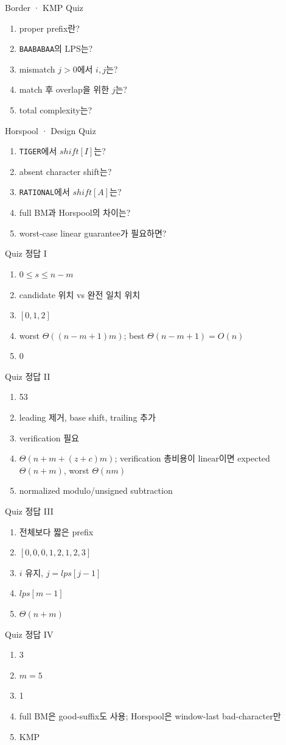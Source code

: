 \begin{frame}{Border · KMP Quiz}
\small\begin{enumerate}\item proper prefix란?\item \texttt{BAABABAA}의 LPS는?\item mismatch \(j>0\)에서 \(i,j\)는?\item match 후 overlap을 위한 \(j\)는?\item total complexity는?\end{enumerate}
\end{frame}
\begin{frame}{Horspool · Design Quiz}
\small\begin{enumerate}\item \texttt{TIGER}에서 \(shift[I]\)는?\item absent character shift는?\item \texttt{RATIONAL}에서 \(shift[A]\)는?\item full BM과 Horspool의 차이는?\item worst-case linear guarantee가 필요하면?\end{enumerate}
\end{frame}
\begin{frame}{Quiz 정답 I}
\small\begin{enumerate}\item \(0\le s\le n-m\)\item candidate 위치 vs 완전 일치 위치\item \([0,1,2]\)\item worst \(\Theta((n-m+1)m)\); best \(\Theta(n-m+1)=O(n)\)\item 0\end{enumerate}
\end{frame}
\begin{frame}{Quiz 정답 II}
\small\begin{enumerate}\item 53\item leading 제거, base shift, trailing 추가\item verification 필요\item \(\Theta(n+m+(z+c)m)\); verification 총비용이 linear이면 expected \(\Theta(n+m)\), worst \(\Theta(nm)\)\item normalized modulo/unsigned subtraction\end{enumerate}
\end{frame}
\begin{frame}{Quiz 정답 III}
\small\begin{enumerate}\item 전체보다 짧은 prefix\item \([0,0,0,1,2,1,2,3]\)\item \(i\) 유지, \(j=lps[j-1]\)\item \(lps[m-1]\)\item \(\Theta(n+m)\)\end{enumerate}
\end{frame}
\begin{frame}{Quiz 정답 IV}
\small\begin{enumerate}\item 3\item \(m=5\)\item 1\item full BM은 good-suffix도 사용; Horspool은 window-last bad-character만\item KMP\end{enumerate}
\end{frame}

